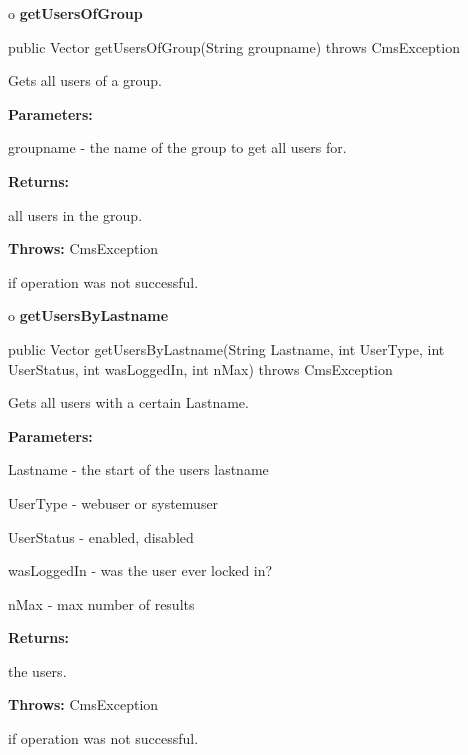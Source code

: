 o {\bf getUsersOfGroup} 

\begin{PRE}
 public Vector getUsersOfGroup(String groupname) throws CmsException
\end{PRE}

\begin{description}
\htmlDD Gets all users of a group. 

\begin{description}
\item {\bf Parameters:}  

groupname - the name of the group to get all users for.  
\item {\bf Returns:}  

all users in the group.  
\item {\bf Throws:} CmsException  

if operation was not successful.  
\end{description}

\end{description}

o {\bf getUsersByLastname} 

\begin{PRE}
 public Vector getUsersByLastname(String Lastname,
                                  int UserType,
                                  int UserStatus,
                                  int wasLoggedIn,
                                  int nMax) throws CmsException
\end{PRE}

\begin{description}
\htmlDD Gets all users with a certain Lastname. 

\begin{description}
\item {\bf Parameters:}  

Lastname - the start of the users lastname  

UserType - webuser or systemuser  

UserStatus - enabled, disabled  

wasLoggedIn - was the user ever locked in?  

nMax - max number of results  
\item {\bf Returns:}  

the users.  
\item {\bf Throws:} CmsException  

if operation was not successful.  
\end{description}

\end{description}

